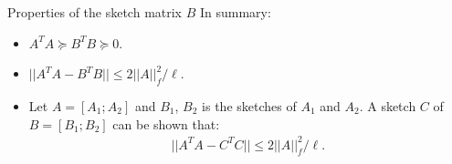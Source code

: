 \documentclass[first=dgreen,second=purple,logo=redque]{aaltoslides}
\newcommand{\vectornorm}[1]{\left\|#1\right\|}
\begin{document}
\begin{frame}[allowframebreaks=1]{Properties of the sketch matrix $B$}
In summary:
\begin{itemize}
  \item $A^TA \succeq B^TB \succeq 0$.
  \vspace{2 mm}
  \item $ ||A^TA - B^TB || \leq 2|| A||_f^2/\ell$. 
  \vspace{2 mm}
  \item Let $A = [A_1;A_2]$ and $B_1$, $B_2$ is the sketches of $A_1$ and $A_2$. A sketch $C$ of $B=[B_1;B_2]$ can be shown that:\\
  {\color{blue}\begin{align}
    ||A^TA - C^TC || \leq 2|| A||_f^2/\ell. \nonumber 
  \end{align}}
\end{itemize}
\end{frame}



\end{document}
